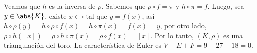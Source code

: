 \documentclass{article}
\begin{document}
\begin{enumerate}
    \vspace{2mm}
    \centerline{
    }
    Veamos que $h$ es la inversa de $\rho$. Sabemos que $\rho\circ f=\pi$ y $h\circ\pi=f$. Luego,
    sea $y\in\abs{K}$, existe $x\in\square$ tal que $y=f(x)$, así 
    $h\circ\rho(y)=h\circ\rho\circ f(x)=h\circ\pi(x)=f(x)=y$, por otro lado, 
    $\rho\circ h([x])=\rho\circ h\circ\pi(x)=\rho\circ f(x)=[x]$. Por lo tanto, $(K,\rho)$ es una 
    triangulación del toro. La característica de Euler es $V-E+F=9-27+18=0$.
\end{enumerate}

\end{document}
